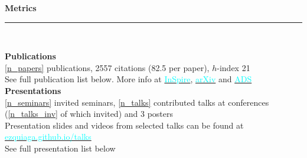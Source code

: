 \documentclass[11pt,a4paper]{article}
\newcommand{\secsizesmall}{0.05\linewidth}
\newcommand{\contsizelong}{0.95\linewidth}
\newcommand{\sectionsep}{12pt}
\newcounter{papers}
\newcounter{seminars}
\newcounter{talks}
\newcounter{talks_inv}
\begin{document}
\vspace{-5pt}
\vspace{\sectionsep}
\textbf{Metrics} \vspace{-8pt}\\ {\rule{\linewidth}{0.6pt}}\vspace{5pt}\\
\begin{minipage}[t]{\secsizesmall}
\begin{flushleft}
\end{flushleft}
\end{minipage}
\begin{minipage}[t]{\contsizelong}
\begin{flushleft}
\textbf{Publications} \\
\ref{n_papers} publications, %
2557 citations (82.5 per paper), $h$-index 21 \\
See full publication list below. More info at \href{https://inspirehep.net/literature?sort=mostrecent&size=25&page=1&q=J.M.Ezquiaga&ui-citation-summary=true}{\textcolor{cyan}{InSpire}}, \href{https://arxiv.org/search/?query=ezquiaga&source=header&searchtype=all}{\textcolor{cyan}{arXiv}} and \href{https://ui.adsabs.harvard.edu/search/q=ezquiaga}{\textcolor{cyan}{ADS}} \\
\vspace{5pt}
\textbf{Presentations} \\
\ref{n_seminars} invited seminars, \ref{n_talks} contributed talks at conferences (\ref{n_talks_inv} of which invited) and 3 posters \\
Presentation slides and videos from selected talks can be found at \href{https://ezquiaga.github.io/talks.html}{\textcolor{cyan}{ezquiaga.github.io/talks}}\\
See full presentation list below
\end{flushleft}
\end{minipage}
\end{document}
